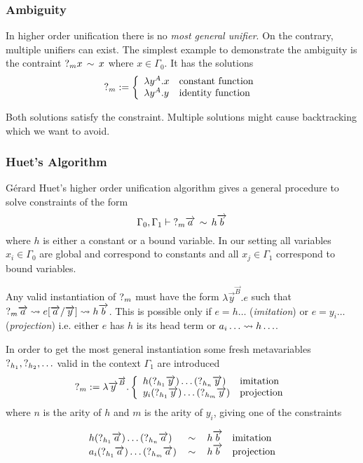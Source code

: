 \subsubsection{Ambiguity}
In higher order unification there is no \emph{most general unifier}. On the
contrary, multiple unifiers can exist. The simplest example to demonstrate the
ambiguity is the contraint ${?_{m}} x \, \sim \, x$ where $x \in \Gamma_0$. It has
the solutions
$$
    {?_{m}} := \left\{ \begin{array}{lllll} 
        \lambda y^A. x & \text{constant function}
        \\
        \lambda y^A. y & \text{identity function}
     \end{array} \right.
$$

Both solutions satisfy the constraint. Multiple solutions might cause
backtracking which we want to avoid.




\subsubsection{Huet's Algorithm}
Gérard Huet's higher order unification algorithm gives a general procedure to
solve constraints of the form
$$
    \Gamma_0, \Gamma_1
    \vdash
    {?_{m}} {\overrightarrow {a}} \, \sim \, h {\overrightarrow {b}}
$$
where $h$ is either a constant or a bound variable. In our setting all variables
$x_i \in \Gamma_0$ are global and correspond to constants and all $x_j
\in \Gamma_1$ correspond to bound variables.

Any valid instantiation of ${?_{m}}$ must have the form
    $\lambda \vec y^{\vec B}. e$
such that
    ${?_{m}} {\overrightarrow {a}} \leadsto e[{\overrightarrow {a}}/{\overrightarrow {y}}] \leadsto h {\overrightarrow {b}}$.
%
This is possible only if
    $e = h \ldots$ (\emph{imitation}) or
    $e = y_i \ldots$ (\emph{projection})
i.e. either $e$ has $h$ is its head term or
    $a_i \ldots \leadsto h \ldots$.


In order to get the most general instantiation some fresh metavariables ${?_{h_1}}, {?_{h_2}}, \ldots$ valid in the context $\Gamma_1$ are introduced
$$
    {?_{m}}
    := \lambda {\overrightarrow {y}}^{{\overrightarrow {B}}}.
    \left\{ \begin{array}{lllll} 
        h ({?_{h_1}} {\overrightarrow {y}}) \ldots ({?_{h_n}} {\overrightarrow {y}})
        & \text{imitation}
        \\
        y_i ({?_{h_1}} {\overrightarrow {y}}) \ldots ({?_{h_m}} {\overrightarrow {y}})
        & \text{projection}
     \end{array} \right.
$$
%
where $n$ is the arity of $h$ and $m$ is the arity of $y_i$,
giving one of the constraints

$$
\begin{array}{lllll} 
    h ({?_{h_1}} {\overrightarrow {a}}) \ldots ({?_{h_n}} {\overrightarrow {a}})
    &\, \sim \,&
    h {\overrightarrow {b}}
    & \text{imitation}
    \\
    a_i ({?_{h_1}} {\overrightarrow {a}}) \ldots ({?_{h_m}} {\overrightarrow {a}})
    &\, \sim \,&
    h {\overrightarrow {b}}
    & \text{projection}
 \end{array}
$$

